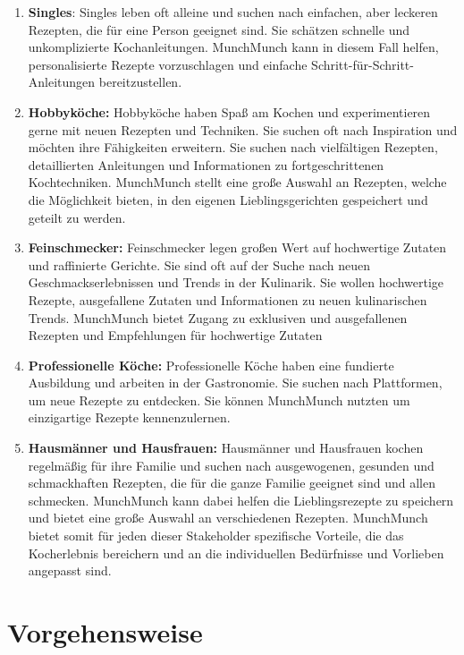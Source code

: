 \documentclass[conference,a4paper,flushend]{cs-techrep}
\begin{document}
\begin{enumerate}
\item \textbf{Singles}: Singles leben oft alleine und suchen nach einfachen, aber leckeren Rezepten, die für eine Person geeignet sind. Sie schätzen schnelle und unkomplizierte Kochanleitungen. MunchMunch kann in diesem Fall helfen, personalisierte Rezepte vorzuschlagen und einfache Schritt-für-Schritt-Anleitungen bereitzustellen.

\item \textbf{Hobbyköche:} Hobbyköche haben Spaß am Kochen und experimentieren gerne mit neuen Rezepten und Techniken. Sie suchen oft nach Inspiration und möchten ihre Fähigkeiten erweitern. Sie suchen nach vielfältigen Rezepten, detaillierten Anleitungen und Informationen zu fortgeschrittenen Kochtechniken.
MunchMunch stellt eine große Auswahl an Rezepten, welche die Möglichkeit bieten, in den eigenen Lieblingsgerichten gespeichert und geteilt zu werden.

\item \textbf{Feinschmecker:} Feinschmecker legen großen Wert auf hochwertige Zutaten und raffinierte Gerichte. Sie sind oft auf der Suche nach neuen Geschmackserlebnissen und Trends in der Kulinarik. Sie wollen hochwertige Rezepte, ausgefallene Zutaten und Informationen zu neuen kulinarischen Trends. MunchMunch bietet Zugang zu exklusiven und ausgefallenen Rezepten und Empfehlungen für hochwertige Zutaten 

\item \textbf{Professionelle Köche:} Professionelle Köche haben eine fundierte Ausbildung und arbeiten in der Gastronomie. Sie suchen nach Plattformen, um neue Rezepte zu entdecken. Sie können MunchMunch nutzten um einzigartige Rezepte kennenzulernen.

\item \textbf{Hausmänner und Hausfrauen:} Hausmänner und Hausfrauen kochen regelmäßig für ihre Familie und suchen nach ausgewogenen, gesunden und schmackhaften Rezepten, die für die ganze Familie geeignet sind und allen schmecken. MunchMunch kann dabei helfen die Lieblingsrezepte zu speichern und bietet eine große Auswahl an verschiedenen Rezepten.
\hfill \break
MunchMunch bietet somit für jeden dieser Stakeholder spezifische Vorteile, die das Kocherlebnis bereichern und an die individuellen Bedürfnisse und Vorlieben angepasst sind.

\end{enumerate}
\section{Vorgehensweise}
\end{document}
